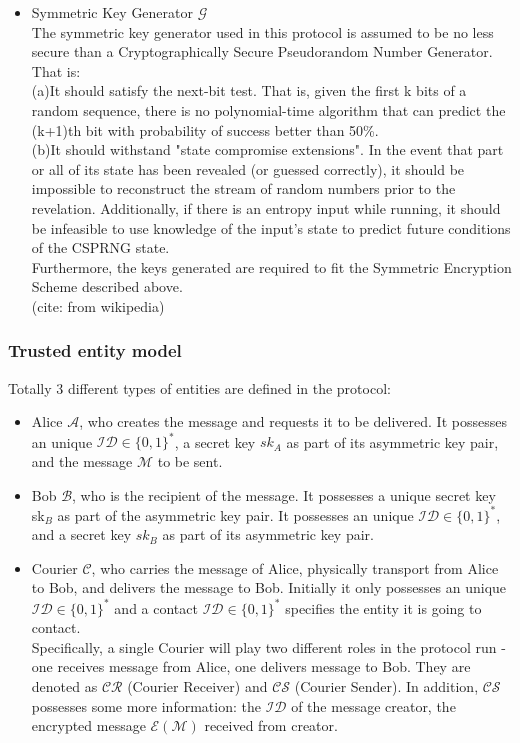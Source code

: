 \documentclass[10pt,a4paper]{article}
\begin{document}
\begin{itemize}
\item Symmetric Key Generator $\mathcal{G}$\\
The symmetric key generator used in this protocol is assumed to be no less secure than a Cryptographically Secure Pseudorandom Number Generator. That is: \\
(a)It should satisfy the next-bit test. That is, given the first k bits of a random sequence, there is no polynomial-time algorithm that can predict the (k+1)th bit with probability of success better than 50\%. \\
(b)It should withstand "state compromise extensions". In the event that part or all of its state has been revealed (or guessed correctly), it should be impossible to reconstruct the stream of random numbers prior to the revelation. Additionally, if there is an entropy input while running, it should be infeasible to use knowledge of the input's state to predict future conditions of the CSPRNG state.\\
Furthermore, the keys generated are required to fit the Symmetric Encryption Scheme described above.
\\
(cite: from wikipedia)

\end{itemize}

\subsubsection*{Trusted entity model}
Totally 3 different types of entities are defined in the protocol:
\begin{itemize}
\item Alice $\mathcal{A}$, who creates the message and requests it to be delivered. It possesses an unique $\mathcal{ID} \in \{0, 1\}^*$, a secret key $sk_A$ as part of its asymmetric key pair, and the message $\mathcal{M}$ to be sent.
\item Bob $\mathcal{B}$, who is the recipient of the message. It possesses a unique secret key sk$_B$ as part of the asymmetric key pair. It possesses an unique $\mathcal{ID} \in \{0, 1\}^*$, and a secret key $sk_B$ as part of its asymmetric key pair.
\item Courier $\mathcal{C}$, who carries the message of Alice, physically transport from Alice to Bob, and delivers the message to Bob. Initially it only possesses an unique $\mathcal{ID} \in \{0, 1\}^*$ and a contact $\mathcal{ID} \in \{0, 1\}^*$ specifies the entity it is going to contact.\\
Specifically, a single Courier will play two different roles in the protocol run - one receives message from Alice, one delivers message to Bob. They are denoted as $\mathcal{CR}$ (Courier Receiver) and $\mathcal{CS}$ (Courier Sender). In addition, $\mathcal{CS}$ possesses some more information: the $\mathcal{ID}$ of the message creator, the encrypted message $\mathcal{E(M)} $ received from creator.
\end{itemize}
\end{document}
